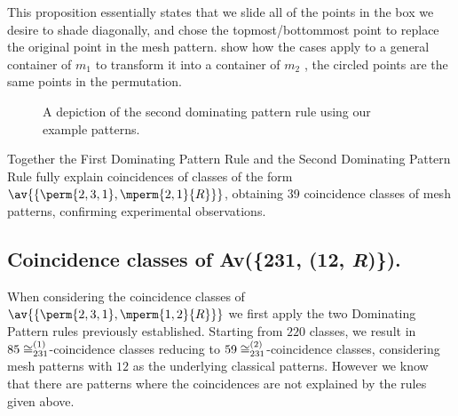 This proposition essentially states that we slide all of the points in the box we desire
to shade diagonally, and chose the topmost/bottommost point to replace the original
point in the mesh pattern.  show how the cases apply to a general container of \(m_1\) to transform it into a container of \(m_2\) , the circled points are the same points in the permutation.
\begin{figure}
\raisebox{8ex}{\(\coinc{}\)}
\caption{A depiction of the second dominating pattern rule using our example patterns.}
\label{fig:d2}
\end{figure}


Together the First Dominating Pattern Rule and the Second Dominating
Pattern Rule fully explain coincidences of classes of the form
\(\av{\{\perm{2,3,1},\mperm{2,1}{R}\}}\), obtaining 39 coincidence classes of
mesh patterns, confirming experimental observations.

\subsection{Coincidence classes of Av(\{231, (12, \textit{R})\}).}
When considering the coincidence classes of \(\av{\{\perm{2,3,1},\mperm{1,2}{R}\}}\)
we first apply the two Dominating Pattern rules previously established.
Starting from \(220\) classes, we result in \(85 \coinc[(1)]{231}\)-coincidence classes
reducing to \(59 \coinc[(2)]{231}\)-coincidence classes, considering mesh patterns with
\(12\) as the underlying classical patterns. However we know that there are patterns
where the coincidences are not explained by the rules given above.

